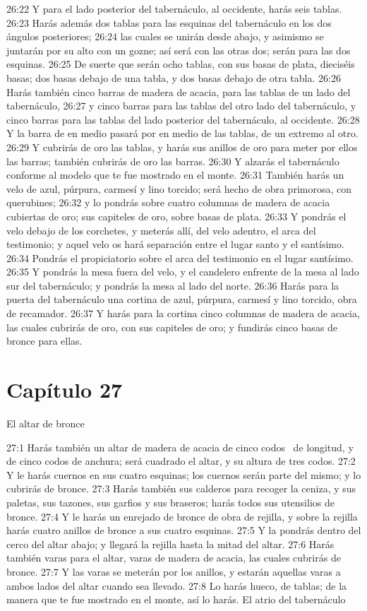 26:22 Y para el lado posterior del tabernáculo, al occidente, harás seis tablas. 
26:23 Harás además dos tablas para las esquinas del tabernáculo en los dos ángulos posteriores; 
26:24 las cuales se unirán desde abajo, y asimismo se juntarán por su alto con un gozne; así será con las otras dos; serán para las dos esquinas. 
26:25 De suerte que serán ocho tablas, con sus basas de plata, dieciséis basas; dos basas debajo de una tabla, y dos basas debajo de otra tabla. 
26:26 Harás también cinco barras de madera de acacia, para las tablas de un lado del tabernáculo, 
26:27 y cinco barras para las tablas del otro lado del tabernáculo, y cinco barras para las tablas del lado posterior del tabernáculo, al occidente. 
26:28 Y la barra de en medio pasará por en medio de las tablas, de un extremo al otro. 
26:29 Y cubrirás de oro las tablas, y harás sus anillos de oro para meter por ellos las barras; también cubrirás de oro las barras. 
26:30 Y alzarás el tabernáculo conforme al modelo que te fue mostrado en el monte. 
26:31 También harás un velo de azul, púrpura, carmesí y lino torcido; será hecho de obra primorosa, con querubines; 
26:32 y lo pondrás sobre cuatro columnas de madera de acacia cubiertas de oro; sus capiteles de oro, sobre basas de plata. 
26:33 Y pondrás el velo debajo de los corchetes, y meterás allí, del velo adentro, el arca del testimonio; y aquel velo os hará separación entre el lugar santo y el santísimo. 
26:34 Pondrás el propiciatorio sobre el arca del testimonio en el lugar santísimo. 
26:35 Y pondrás la mesa fuera del velo, y el candelero enfrente de la mesa al lado sur del tabernáculo; y pondrás la mesa al lado del norte. 
26:36 Harás para la puerta del tabernáculo una cortina de azul, púrpura, carmesí y lino torcido, obra de recamador. 
26:37 Y harás para la cortina cinco columnas de madera de acacia, las cuales cubrirás de oro, con sus capiteles de oro; y fundirás cinco basas de bronce para ellas. 
\section*{Capítulo 27}
El altar de bronce 


27:1 Harás también un altar de madera de acacia de cinco codos  de longitud, y de cinco codos de anchura; será cuadrado el altar, y su altura de tres codos. 
27:2 Y le harás cuernos en sus cuatro esquinas; los cuernos serán parte del mismo; y lo cubrirás de bronce. 
27:3 Harás también sus calderos para recoger la ceniza, y sus paletas, sus tazones, sus garfios y sus braseros; harás todos sus utensilios de bronce. 
27:4 Y le harás un enrejado de bronce de obra de rejilla, y sobre la rejilla harás cuatro anillos de bronce a sus cuatro esquinas. 
27:5 Y la pondrás dentro del cerco del altar abajo; y llegará la rejilla hasta la mitad del altar. 
27:6 Harás también varas para el altar, varas de madera de acacia, las cuales cubrirás de bronce. 
27:7 Y las varas se meterán por los anillos, y estarán aquellas varas a ambos lados del altar cuando sea llevado. 
27:8 Lo harás hueco, de tablas; de la manera que te fue mostrado en el monte, así lo harás. 
El atrio del tabernáculo 

